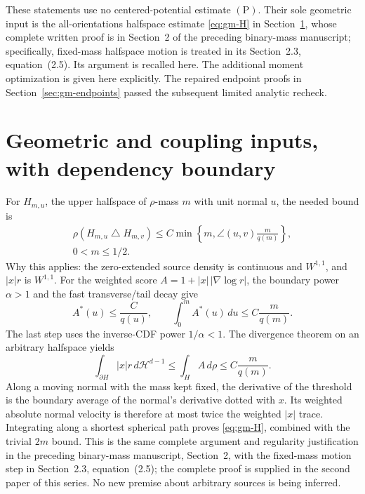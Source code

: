 These statements use no centered-potential estimate \((\mathrm P)\). Their sole geometric input is the all-orientations halfspace estimate \eqref{eq:gm-H} in Section~\ref{sec:gm-inputs}, whose complete written proof is in Section~2 of the preceding binary-mass manuscript; specifically, fixed-mass halfspace motion is treated in its Section~2.3, equation~(2.5). Its argument is recalled here. The additional moment optimization is given here explicitly. The repaired endpoint proofs in Section~\ref{sec:gm-endpoints} passed the subsequent limited analytic recheck.

\section{Geometric and coupling inputs, with dependency boundary}\label{sec:gm-inputs}

For \(H_{m,u}\), the upper halfspace of \(\rho\)-mass \(m\) with unit normal \(u\), the needed bound is
\begin{equation}
 \begin{gathered}
 \rho(H_{m,u}\mathbin{\triangle}H_{m,v})
 \le C\min\left\{m,\angle(u,v)\frac{m}{q(m)}\right\},\\
 0<m\le1/2.
 \end{gathered}
 \tag{H}\label{eq:gm-H}
\end{equation}
Why this applies: the zero-extended source density is continuous and \(W^{1,1}\), and \(|x|r\) is \(W^{1,1}\). For the weighted score \(A=1+|x|\,|\nabla\log r|\), the boundary power \(\alpha>1\) and the fast transverse/tail decay give
\[
 A^*(u)\le\frac C{q(u)},\qquad
 \int_0^m A^*(u)\,du\le C\frac{m}{q(m)}.
\]
The last step uses the inverse-CDF power \(1/\alpha<1\). The divergence theorem on an arbitrary halfspace yields
\[
 \int_{\partial H}|x|r\,d\mathcal H^{d-1}
 \le\int_H A\,d\rho\le C\frac{m}{q(m)}.
\]
Along a moving normal with the mass kept fixed, the derivative of the threshold is the boundary average of the normal's derivative dotted with \(x\). Its weighted absolute normal velocity is therefore at most twice the weighted \(|x|\) trace. Integrating along a shortest spherical path proves \eqref{eq:gm-H}, combined with the trivial \(2m\) bound. This is the same complete argument and regularity justification in the preceding binary-mass manuscript, Section~2, with the fixed-mass motion step in Section~2.3, equation~(2.5); the complete proof is supplied in the second paper of this series. No new premise about arbitrary sources is being inferred.

